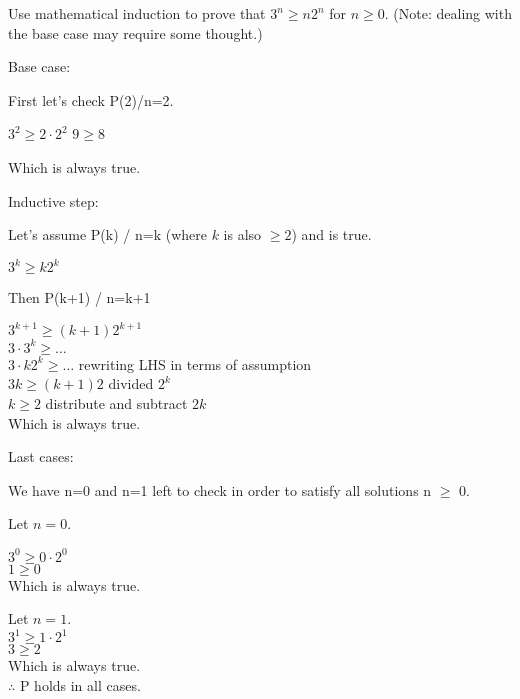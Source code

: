 
\begin{problem}
Use mathematical induction to prove that $3^n \ge n2^n$ for $n\ge 0$. 
(Note: dealing with the base case may require some thought.)
\end{problem}

\begin{flushleft}
Base case:

First let's check P(2)/n=2.

$3^2 \ge 2\cdot2^2$
$9 \ge 8$

Which is always true.

\vskip 0.1in
Inductive step:

Let's assume P(k) / n=k (where $k$ is also $\ge 2$) and is true.

$3^k \ge k2^k$

Then P(k+1) / n=k+1

$3^{k+1} \ge (k+1)2^{k+1}$ \\
$3\cdot3^k \ge \ldots $  \\
$3\cdot k 2^k \ge \ldots $ rewriting LHS in terms of assumption \\
$3k \ge (k+1)2$ divided $2^k$ \\
$k \ge 2$ distribute and subtract $2k$ \\
Which is always true.

\vskip 0.1in
Last cases:

We have n=0 and n=1 left to check in order to satisfy all solutions n $\ge$ 0.

Let $n=0$.

$3^0 \ge 0\cdot2^0$\\
$1 \ge 0$\\

Which is always true.

Let $n=1$.\\
$3^1 \ge 1\cdot2^1$\\
$3 \ge 2$\\
Which is always true.\\

\vskip 0.1in
$\therefore$ P holds in all cases.

\end{flushleft}



